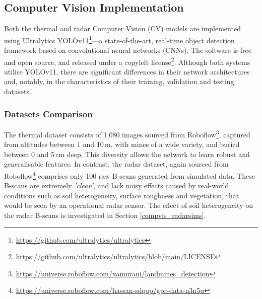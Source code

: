 \subsection{Computer Vision Implementation} \label{compvis_implementation}

    Both the thermal and radar Computer Vision (CV) models are implemented using Ultralytics YOLOv11\footnote{\url{https://github.com/ultralytics/ultralytics}}—a state-of-the-art, real-time object detection framework based on convolutional neural networks (CNNs). The software is free and open source, and released under a copyleft license\footnote{\url{https://github.com/ultralytics/ultralytics/blob/main/LICENSE}}. Although both systems utilise YOLOv11, there are significant differences in their network architectures and, notably, in the characteristics of their training, validation and testing datasets.


\subsubsection{Datasets Comparison} \label{sec:cv_dataset_comparison}

The thermal dataset consists of 1,080 images sourced from Roboflow\footnote{\url{https://universe.roboflow.com/xamurani/landmines_detection}}, captured from altitudes between 1 and 10\,m, with mines of a wide variety, and buried between 0 and 5\,cm deep. This diversity allows the network to learn robust and generalisable features. In contrast, the radar dataset, again sourced from Roboflow\footnote{\url{https://universe.roboflow.com/hassan-sdqop/gpr-data-n3n5u}} comprises only 100 raw B-scans generated from simulated data. These B-scans are extremely \textit{'clean'}, and lack noisy effects caused by real-world conditions such as soil heterogeneity, surface roughness and vegetation, that would be seen by an operational radar sensor. The effect of soil heterogeneity on the radar B-scans is investigated in Section \ref{compvis_radarsims}. 

